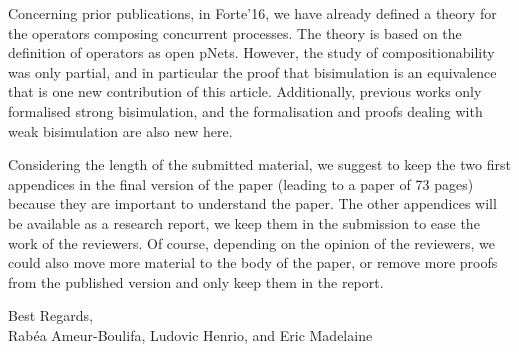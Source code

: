 \documentclass[10pt]{article}
\begin{document}
Concerning prior publications, in Forte'16, we have already defined a theory for the operators composing concurrent processes. The theory is based on the definition of operators as open pNets. However, the study of compositionability was only partial, and in particular the proof that bisimulation is an equivalence that is one new contribution of this article. Additionally, previous works only formalised strong bisimulation, and the formalisation and proofs dealing with weak bisimulation are also new here.




\smallskip

Considering the length of the submitted material,
 we   suggest to
keep the two first appendices in the final version of the paper (leading to a
paper of 73 pages) because they are important to understand the paper.
The other appendices will be available as a research report, we keep
them in the submission to ease the work of the reviewers. 
Of course, depending on the opinion of the reviewers, we could also move more material to  the body of the paper, or remove more proofs from the published version and only keep them in the report.

\begin{flushright}
  Best Regards,\\
  Rab\'ea Ameur-Boulifa, Ludovic Henrio, and Eric Madelaine
\end{flushright}
\end{document}
